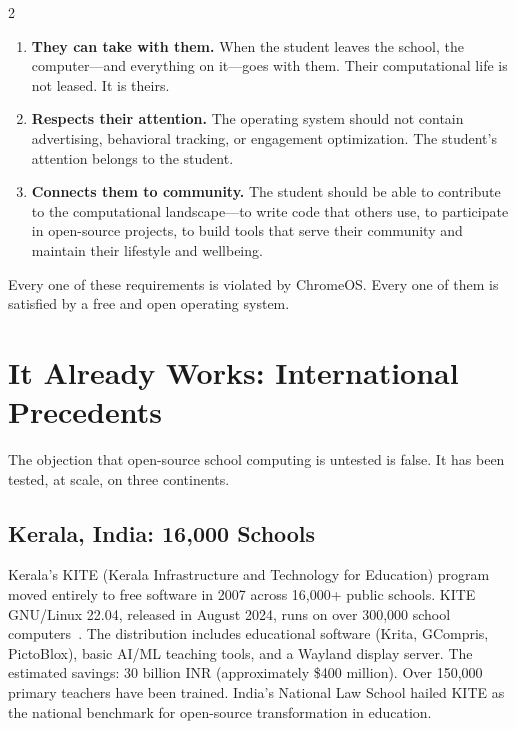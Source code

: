 \documentclass[11pt, a4paper]{article}
\begin{document}
\begin{multicols}{2}
\begin{enumerate}
  \item \textbf{They can take with them.} When the student leaves the school, the computer---and everything on it---goes with them. Their computational life is not leased. It is theirs.

  \item \textbf{Respects their attention.} The operating system should not contain advertising, behavioral tracking, or engagement optimization. The student's attention belongs to the student.

  \item \textbf{Connects them to community.} The student should be able to contribute to the computational landscape---to write code that others use, to participate in open-source projects, to build tools that serve their community and maintain their lifestyle and wellbeing.
\end{enumerate}

Every one of these requirements is violated by ChromeOS. Every one of them is satisfied by a free and open operating system.


\section{It Already Works: International Precedents}

The objection that open-source school computing is untested is false. It has been tested, at scale, on three continents.

\subsection{Kerala, India: 16,000 Schools}

Kerala's KITE (Kerala Infrastructure and Technology for Education) program moved entirely to free software in 2007 across 16,000+ public schools. KITE GNU/Linux 22.04, released in August 2024, runs on over 300,000 school computers~\citep{kite2024gnulinux}. The distribution includes educational software (Krita, GCompris, PictoBlox), basic AI/ML teaching tools, and a Wayland display server. The estimated savings: 30 billion INR (approximately \$400 million). Over 150,000 primary teachers have been trained. India's National Law School hailed KITE as the national benchmark for open-source transformation in education.


\end{multicols}
\end{document}
